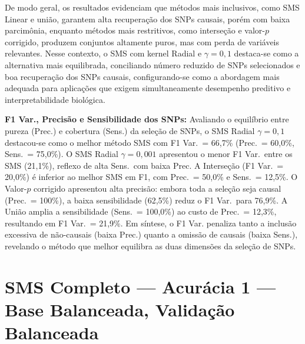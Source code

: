 \documentclass[
    12pt,
    a4paper,
    oneside,
    english,
    french,
    spanish,
    brazil
    ]{abntex2}
\newcommand{\novo}[1]{\textcolor{corNova}{#1}}
\begin{document}
De modo geral, os resultados evidenciam que métodos mais inclusivos, como SMS Linear e união, garantem alta recuperação dos SNPs causais, porém com baixa parcimônia, enquanto métodos mais restritivos, como interseção e valor-$p$ corrigido, produzem conjuntos altamente puros, mas com perda de variáveis relevantes. Nesse contexto, o SMS com kernel Radial e $\gamma = 0{,}1$ destaca-se como a alternativa mais equilibrada, conciliando número reduzido de SNPs selecionados e boa recuperação dos SNPs causais, configurando-se como a abordagem mais adequada para aplicações que exigem simultaneamente desempenho preditivo e interpretabilidade biológica.


\novo{\textbf{F1 Var., Precisão e Sensibilidade dos SNPs:} Avaliando o equilíbrio entre pureza (Prec.) e cobertura (Sens.) da seleção de SNPs, o SMS Radial $\gamma=0{,}1$ destacou-se como o melhor método SMS com F1 Var.\ = 66,7\% (Prec.\ = 60,0\%, Sens.\ = 75,0\%). O SMS Radial $\gamma=0{,}001$ apresentou o menor F1 Var.\ entre os SMS (21,1\%), reflexo de alta Sens.\ com baixa Prec. A Interseção (F1 Var.\ = 20,0\%) é inferior ao melhor SMS em F1, com Prec.\ = 50,0\% e Sens.\ = 12,5\%. O Valor-$p$ corrigido apresentou alta precisão: embora toda a seleção seja causal (Prec.\ = 100\%), a baixa sensibilidade (62,5\%) reduz o F1 Var.\ para 76,9\%. A União amplia a sensibilidade (Sens.\ = 100,0\%) ao custo de Prec.\ = 12,3\%, resultando em F1 Var.\ = 21,9\%. Em síntese, o F1 Var. penaliza tanto a inclusão excessiva de não-causais (baixa Prec.) quanto a omissão de causais (baixa Sens.), revelando o método que melhor equilibra as duas dimensões da seleção de SNPs.}
\section{SMS Completo --- Acurácia 1 --- Base Balanceada, Validação Balanceada}
\end{document}
